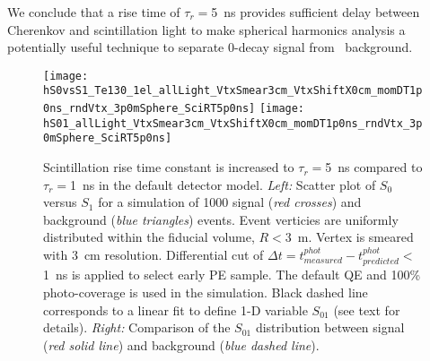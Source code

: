 We conclude that a rise time of $\tau_r=$5~ns provides sufficient delay between
Cherenkov and scintillation light to make spherical harmonics analysis a potentially useful technique to separate 
0\nbb-decay signal from \B~background.

\begin{figure*}[h]
  \centering
  \texttt{[image: hS0vsS1\_Te130\_1el\_allLight\_VtxSmear3cm\_VtxShiftX0cm\_momDT1p0ns\_rndVtx\_3p0mSphere\_SciRT5p0ns]} 
  \texttt{[image: hS01\_allLight\_VtxSmear3cm\_VtxShiftX0cm\_momDT1p0ns\_rndVtx\_3p0mSphere\_SciRT5p0ns]}
  \caption{Scintillation rise time constant is increased to $\tau_r=$5~ns compared to $\tau_r=$1~ns in the default detector model.
    \emph{Left:} Scatter plot of $S_0$ versus $S_1$ for a simulation of 1000 signal (\emph{red crosses}) and background
    (\emph{blue triangles}) events. Event verticies are uniformly distributed within the fiducial volume, $R<3$~m.
    Vertex is smeared with 3~cm resolution. Differential cut of
    $\Delta t=t^{phot}_{measured} - t^{phot}_{predicted}<$1~ns is applied to select early PE sample.
    The default QE and 100\% photo-coverage is used in the simulation.
    Black dashed line corresponds to a linear fit to define 1-D variable $S_{01}$ (see text for details).
    \emph{Right:} Comparison of the $S_{01}$ distribution between signal (\emph{red solid line}) and background (\emph{blue dashed line}).}
\label{fig:SL_Te_SmearX3cm_momDT1ns_rndVtx_3p0m_SciRT5p0ns}
\end{figure*}


